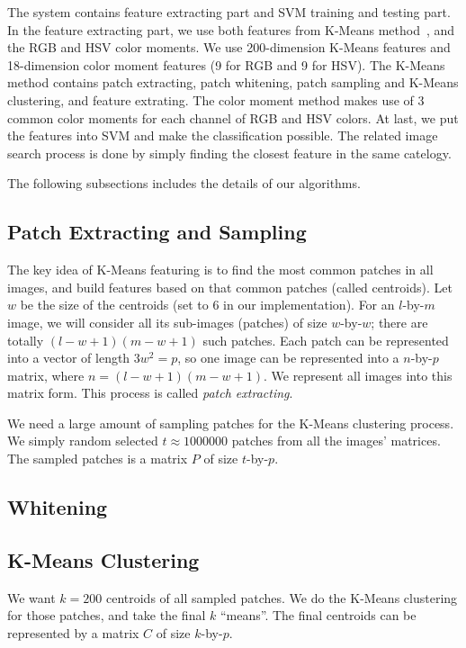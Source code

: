 \documentclass{acm_proc_article-sp}
\begin{document}
The system contains feature extracting part and SVM training and testing part.
In the feature extracting part,
    we use both features from K-Means method~\cite{coates2011analysis},
    and the RGB and HSV color moments.
We use 200-dimension K-Means features and 18-dimension color moment
features (9 for RGB and 9 for HSV).
The K-Means method contains patch extracting, patch whitening,
    patch sampling and K-Means clustering,
    and feature extrating.
The color moment method makes use of 3 common color moments for 
    each channel of RGB and HSV colors.
At last, we put the features into SVM and make the classification possible.
The related image search process is done by simply finding
    the closest feature in the same catelogy.

The following subsections includes the details of our algorithms.

\subsection{Patch Extracting and Sampling}

The key idea of K-Means featuring is to find the most common
    patches in all images, and build features based on that
    common patches (called centroids).
Let $w$ be the size of the centroids (set to $6$ in our implementation).
For an $l$-by-$m$ image,
we will consider all its sub-images (patches) of size $w$-by-$w$;
there are totally $(l-w+1)(m-w+1)$ such patches.
Each patch can be represented into a vector of length $3w^2 = p$,
    so one image can be represented into a $n$-by-$p$ matrix,
    where $n=(l-w+1)(m-w+1)$.
We represent all images into this matrix form.
This process is called \emph{patch extracting}.

We need a large amount of sampling patches for the K-Means clustering process.
We simply random selected $t\approx 1000000$ patches
    from all the images' matrices.
The sampled patches is a matrix $P$ of size $t$-by-$p$.

\subsection{Whitening}


\subsection{K-Means Clustering}

We want $k=200$ centroids of all sampled patches.
We do the K-Means clustering for those patches,
    and take the final $k$ ``means''.
The final centroids can be represented by a matrix $C$ of size $k$-by-$p$.
\end{document}
